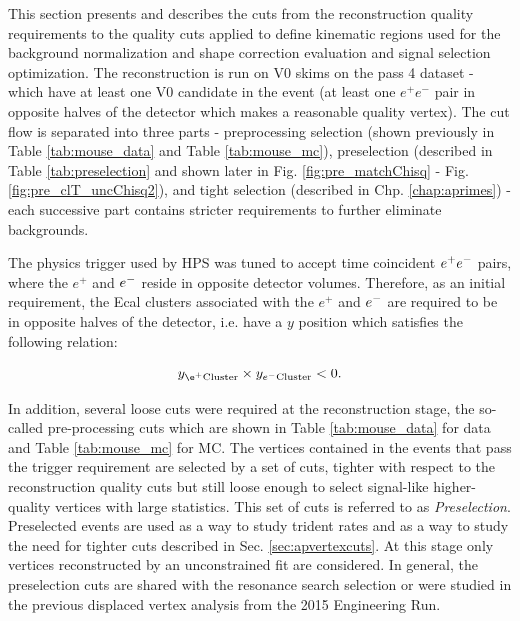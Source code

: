 This section presents and describes the cuts from the reconstruction quality requirements to the quality cuts applied to define kinematic regions used for the background normalization and shape correction evaluation and signal selection optimization. The reconstruction is run on V0 skims on the pass 4 dataset - which have at least one V0 candidate in the event (at least one $e^+e^-$ pair in opposite halves of the detector which makes a reasonable quality vertex). The cut flow is separated into three parts - preprocessing selection (shown previously in Table \ref{tab:mouse_data} and Table \ref{tab:mouse_mc}), preselection (described in Table \ref{tab:preselection} and shown later in Fig. \ref{fig:pre_matchChisq} - Fig. \ref{fig:pre_clT_uncChisq2}), and tight selection (described in Chp. \ref{chap:aprimes}) - each successive part contains stricter requirements to further eliminate backgrounds.


The physics trigger used by HPS was tuned to accept time coincident $e^{+}e^{-}$ pairs, where the $e^+$ and $e^{-}$ reside in opposite detector volumes. Therefore, as an initial requirement, the Ecal clusters associated with the $e^+$ and $e^{-}$ are required to be in opposite halves of the detector, i.e. have a $y$ position which satisfies the following relation:

\begin{equation}
  y_{\e^+ \mathrm{ Cluster}} \times y_{\ele\mathrm{ Cluster}} < 0.
\end{equation}

In addition, several loose cuts were required at the reconstruction stage, the so-called pre-processing cuts which are shown in Table \ref{tab:mouse_data} for data and Table \ref{tab:mouse_mc} for MC. The vertices contained in the events that pass the trigger requirement are selected by a set of cuts, tighter with respect to the reconstruction quality cuts but still loose enough to select signal-like higher-quality vertices with large statistics. This set of cuts is referred to as \textit{Preselection}. Preselected events are used as a way to study trident rates and as a way to study the need for tighter cuts described in Sec. \ref{sec:apvertexcuts}. At this stage only vertices reconstructed by an unconstrained fit are considered. In general, the preselection cuts are shared with the resonance search selection or were studied in the previous displaced vertex analysis from the 2015 Engineering Run. 

